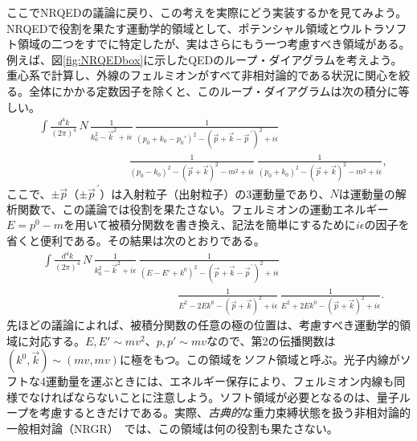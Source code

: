 ここでNRQEDの議論に戻り、この考えを実際にどう実装するかを見てみよう。NRQEDで役割を果たす運動学的領域として、ポテンシャル領域とウルトラソフト領域の二つをすでに特定したが、実はさらにもう一つ考慮すべき領域がある。例えば、図\eqref{fig:NRQEDbox}に示したQEDのループ・ダイアグラムを考えよう。重心系で計算し、外線のフェルミオンがすべて非相対論的である状況に関心を絞る。全体にかかる定数因子を除くと、このループ・ダイアグラムは次の積分に等しい。
%
{\allowdisplaybreaks[0]\begin{align}
	& \int \frac{d^4 k}{(2\pi)^4} \,  N \, \frac{1}{k_0^2 - \vec{k}^{ 2} + i \epsilon } \, \frac{1}{(p_0 +k_0 - p_0')^2- (\vec p + \vec k - \vec{p}^{\,\prime})^2+ i \epsilon } \nonumber \\ 
	& \qquad \qquad \qquad \qquad \frac{1}{(p_0-k_0)^2 - (\vec p + \vec k)^2 - m^2 + i \epsilon } \, \frac{1}{(p_0+k_0)^2 - (\vec p + \vec k)^2- m^2 + i \epsilon   }, 
\end{align}}
%
ここで、$\pm \vec p$（$\pm \vec p^{\, \prime}$）は入射粒子（出射粒子）の3運動量であり、$N$は運動量の解析関数で、この議論では役割を果たさない。フェルミオンの運動エネルギー$E = p^0 - m$を用いて被積分関数を書き換え、記法を簡単にするために$i\epsilon$の因子を省くと便利である。その結果は次のとおりである。
%
\begin{align}
	& \int \frac{d^4 k}{(2\pi)^4} \,  N \, \frac{1}{k_0^2 - \vec{k}^{ 2} + i \epsilon } \, \frac{1}{(E - E' +k^0)^2- (\vec p + \vec k - \vec{p}^{\,\prime})^2+ i \epsilon } \nonumber \\ 
	& \qquad \qquad \qquad \qquad \qquad \qquad \frac{1}{E^2 - 2E k^0 - (\vec p + \vec k)^2 + i \epsilon } \, \frac{1}{E^2 + 2 E k^0 - (\vec p + \vec k)^2+ i \epsilon   }.
\end{align}
%
先ほどの議論によれば、被積分関数の任意の極の位置は、考慮すべき運動学的領域に対応する。$E, E' \sim mv^2$、$p, p' \sim mv$なので、第2の伝播関数は$(k^0, \vec k) \sim (mv, mv)$に極をもつ。この領域を\emph{ソフト}領域と呼ぶ。光子内線がソフトな4運動量を運ぶときには、エネルギー保存により、フェルミオン内線も同様でなければならないことに注意しよう。ソフト領域が必要となるのは、量子ループを考慮するときだけである。実際、\emph{古典的}な重力束縛状態を扱う非相対論的一般相対論（NRGR）~\cite{Goldberger:2007hy,Porto:2016pyg}では、この領域は何の役割も果たさない。

